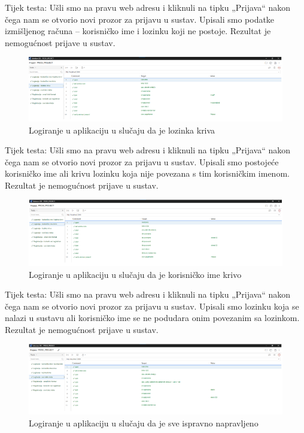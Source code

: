 			Tijek testa: Ušli smo na pravu web adresu i kliknuli na tipku „Prijava“ nakon čega nam se otvorio novi prozor za prijavu u sustav. Upisali smo podatke izmišljenog računa – korisničko ime i lozinku koji ne postoje. Rezultat je nemogućnost prijave u sustav. 
			\begin{figure}[H]
				\includegraphics[scale=1]{slike/Ispit5.PNG} %
				\centering
				\caption{Logiranje u aplikaciju u slučaju da je lozinka kriva}
				\label{fig:promjene}
			\end{figure}
			
			Tijek testa: Ušli smo na pravu web adresu i kliknuli na tipku „Prijava“ nakon čega nam se otvorio novi prozor za prijavu u sustav. Upisali smo postojeće korisničko ime ali krivu lozinku koja nije povezana s tim korisničkim imenom. Rezultat je nemogućnost prijave u sustav. 
 
				\begin{figure}[H]
				\includegraphics[scale=1]{slike/Ispit6.PNG} %
				\centering
				\caption{Logiranje u aplikaciju u slučaju da je korisničko ime krivo}
				\label{fig:promjene}
			\end{figure}
			
			Tijek testa: Ušli smo na pravu web adresu i kliknuli na tipku „Prijava“ nakon čega nam se otvorio novi prozor za prijavu u sustav. Upisali smo lozinku koja se nalazi u sustavu ali korisničko ime se ne podudara onim povezanim sa lozinkom. Rezultat je nemogućnost prijave u sustav. 
			
			\begin{figure}[H]
				\includegraphics[scale=1]{slike/Ispit7.PNG} %
				\centering
				\caption{Logiranje u aplikaciju u slučaju da je sve ispravno napravljeno}
				\label{fig:promjene}
			\end{figure}
			
